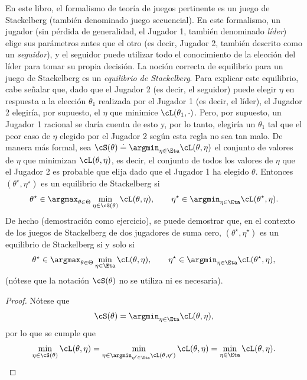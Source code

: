 \documentclass[../../book-main_es.tex]{subfiles}
\begin{document}
En este libro, el formalismo de teoría de juegos pertinente es un juego de Stackelberg
(también denominado juego secuencial). En este formalismo, un
jugador (sin pérdida de generalidad, el Jugador 1, también denominado
\textit{líder}) elige sus parámetros antes que el otro (es decir,
Jugador 2, también descrito como un \textit{seguidor}), y el seguidor
puede utilizar todo el conocimiento de la elección del líder para tomar su propia
decisión. La noción correcta de equilibrio para un juego de Stackelberg es un
\textit{equilibrio de Stackelberg}. Para explicar este equilibrio, cabe señalar
que, dado que el Jugador 2 (es decir, el seguidor) puede elegir \(\eta\)
en respuesta a la elección \(\theta_{1}\) realizada por el Jugador 1 (es decir, el
líder), el Jugador 2 elegiría, por supuesto, el \(\eta\) que minimice
\(\cL(\theta_{1}, \cdot)\). Pero, por supuesto, un Jugador 1 racional se
daría cuenta de esto y, por lo tanto, elegiría un \(\theta_{1}\) tal que el peor caso
de \(\eta\) elegido por el Jugador 2 según esta regla no sea tan malo.
De manera más formal, sea \(\cS(\theta) \doteq \argmin_{\eta \in
\Eta}\cL(\theta, \eta)\) el conjunto de valores de \(\eta\) que minimizan
\(\cL(\theta, \eta)\), es decir, el conjunto de todos los valores de \(\eta\) que el Jugador 2
es probable que elija dado que el Jugador 1 ha elegido \(\theta\). Entonces
\((\theta^{\star}, \eta^{\star})\) es un equilibrio de Stackelberg si
\begin{equation}
    \theta^{\star} \in \argmax_{\theta \in \Theta}\min_{\eta \in
    \cS(\theta)}\cL(\theta, \eta), \qquad \eta^{\star} \in
    \argmin_{\eta  \in \Eta}\cL(\theta^{\star}, \eta).
\end{equation}
De hecho (demostración como ejercicio), se puede demostrar que, en el contexto de
los juegos de Stackelberg de dos jugadores de suma cero, \((\theta^{\star},
\eta^{\star})\) es un equilibrio de Stackelberg si y solo si
\begin{equation}
    \theta^{\star} \in \argmax_{\theta \in \Theta}\min_{\eta \in
    \Eta}\cL(\theta, \eta), \qquad \eta^{\star} \in \argmin_{\eta
    \in \Eta}\cL(\theta^{\star}, \eta),
\end{equation}
(nótese que la notación \(\cS(\theta)\) no se utiliza ni es necesaria).
\begin{proof} %
    Nótese que 
    \begin{equation}
        \cS(\theta) = \argmin_{\eta \in \Eta}\cL(\theta, \eta),
    \end{equation}
    por lo que se cumple que
    \begin{equation}
        \min_{\eta \in \cS(\theta)}\cL(\theta, \eta) = \min_{\eta \in
            \argmin_{\eta^{\prime} \in \Eta}\cL(\theta,
        \eta^{\prime})}\cL(\theta, \eta) = \min_{\eta \in
        \Eta}\cL(\theta, \eta).
    \end{equation}
\end{proof}
\end{document}

